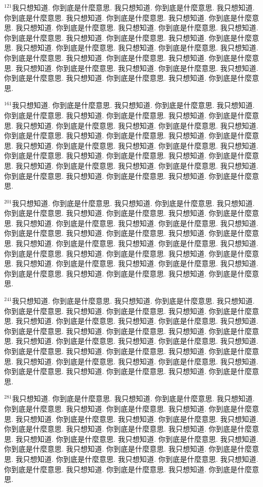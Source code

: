 \documentclass{book}
\begin{document}
$^{121}$我只想知道.
你到底是什麼意思.
我只想知道.
你到底是什麼意思.
我只想知道.
你到底是什麼意思.
我只想知道.
你到底是什麼意思.
我只想知道.
你到底是什麼意思.
我只想知道.
你到底是什麼意思.
我只想知道.
你到底是什麼意思.
我只想知道.
你到底是什麼意思.
我只想知道.
你到底是什麼意思.
我只想知道.
你到底是什麼意思.
我只想知道.
你到底是什麼意思.
我只想知道.
你到底是什麼意思.
我只想知道.
你到底是什麼意思.
我只想知道.
你到底是什麼意思.
我只想知道.
你到底是什麼意思.
我只想知道.
你到底是什麼意思.
我只想知道.
你到底是什麼意思.
我只想知道.
你到底是什麼意思.
我只想知道.
你到底是什麼意思.
我只想知道.
你到底是什麼意思.

$^{161}$我只想知道.
你到底是什麼意思.
我只想知道.
你到底是什麼意思.
我只想知道.
你到底是什麼意思.
我只想知道.
你到底是什麼意思.
我只想知道.
你到底是什麼意思.
我只想知道.
你到底是什麼意思.
我只想知道.
你到底是什麼意思.
我只想知道.
你到底是什麼意思.
我只想知道.
你到底是什麼意思.
我只想知道.
你到底是什麼意思.
我只想知道.
你到底是什麼意思.
我只想知道.
你到底是什麼意思.
我只想知道.
你到底是什麼意思.
我只想知道.
你到底是什麼意思.
我只想知道.
你到底是什麼意思.
我只想知道.
你到底是什麼意思.
我只想知道.
你到底是什麼意思.
我只想知道.
你到底是什麼意思.
我只想知道.
你到底是什麼意思.
我只想知道.
你到底是什麼意思.

$^{201}$我只想知道.
你到底是什麼意思.
我只想知道.
你到底是什麼意思.
我只想知道.
你到底是什麼意思.
我只想知道.
你到底是什麼意思.
我只想知道.
你到底是什麼意思.
我只想知道.
你到底是什麼意思.
我只想知道.
你到底是什麼意思.
我只想知道.
你到底是什麼意思.
我只想知道.
你到底是什麼意思.
我只想知道.
你到底是什麼意思.
我只想知道.
你到底是什麼意思.
我只想知道.
你到底是什麼意思.
我只想知道.
你到底是什麼意思.
我只想知道.
你到底是什麼意思.
我只想知道.
你到底是什麼意思.
我只想知道.
你到底是什麼意思.
我只想知道.
你到底是什麼意思.
我只想知道.
你到底是什麼意思.
我只想知道.
你到底是什麼意思.
我只想知道.
你到底是什麼意思.

$^{241}$我只想知道.
你到底是什麼意思.
我只想知道.
你到底是什麼意思.
我只想知道.
你到底是什麼意思.
我只想知道.
你到底是什麼意思.
我只想知道.
你到底是什麼意思.
我只想知道.
你到底是什麼意思.
我只想知道.
你到底是什麼意思.
我只想知道.
你到底是什麼意思.
我只想知道.
你到底是什麼意思.
我只想知道.
你到底是什麼意思.
我只想知道.
你到底是什麼意思.
我只想知道.
你到底是什麼意思.
我只想知道.
你到底是什麼意思.
我只想知道.
你到底是什麼意思.
我只想知道.
你到底是什麼意思.
我只想知道.
你到底是什麼意思.
我只想知道.
你到底是什麼意思.
我只想知道.
你到底是什麼意思.
我只想知道.
你到底是什麼意思.
我只想知道.
你到底是什麼意思.

$^{281}$我只想知道.
你到底是什麼意思.
我只想知道.
你到底是什麼意思.
我只想知道.
你到底是什麼意思.
我只想知道.
你到底是什麼意思.
我只想知道.
你到底是什麼意思.
我只想知道.
你到底是什麼意思.
我只想知道.
你到底是什麼意思.
我只想知道.
你到底是什麼意思.
我只想知道.
你到底是什麼意思.
我只想知道.
你到底是什麼意思.
我只想知道.
你到底是什麼意思.
我只想知道.
你到底是什麼意思.
我只想知道.
你到底是什麼意思.
我只想知道.
你到底是什麼意思.
我只想知道.
你到底是什麼意思.
我只想知道.
你到底是什麼意思.
我只想知道.
你到底是什麼意思.
我只想知道.
你到底是什麼意思.
我只想知道.
你到底是什麼意思.
我只想知道.
你到底是什麼意思.
\end{document}
